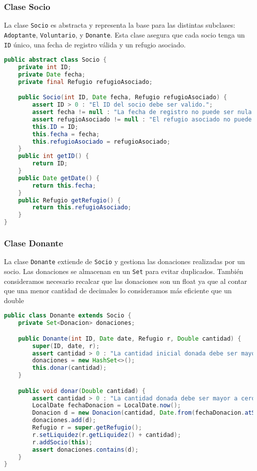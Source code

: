 \subsubsection{Clase Socio}
La clase \texttt{Socio} es abstracta y representa la base para las distintas subclases: 
\texttt{Adoptante}, \texttt{Voluntario}, y \texttt{Donante}. Esta clase asegura que 
cada socio tenga un \texttt{ID} único, una fecha de registro válida y un refugio asociado.
\label{codigo:socio}
\begin{lstlisting}[style = javaNormal, language=Java] 
public abstract class Socio {
    private int ID; 
    private Date fecha;
    private final Refugio refugioAsociado;

    public Socio(int ID, Date fecha, Refugio refugioAsociado) {
        assert ID > 0 : "El ID del socio debe ser valido.";
        assert fecha != null : "La fecha de registro no puede ser nula.";
        assert refugioAsociado != null : "El refugio asociado no puede ser nulo.";
        this.ID = ID;
        this.fecha = fecha;
        this.refugioAsociado = refugioAsociado;
    }
    public int getID() {
        return ID;
    }
    public Date getDate() {
        return this.fecha;
    }
    public Refugio getRefugio() {
        return this.refugioAsociado;
    }
}
\end{lstlisting}
\label{codigo:donante}
\subsubsection{Clase Donante}
La clase \texttt{Donante} extiende de \texttt{Socio} y gestiona las donaciones realizadas 
por un socio. Las donaciones se almacenan en un \texttt{Set} para evitar duplicados. También consideramos
necesario recalcar que las donaciones son un float ya que al contar que una menor cantidad de decimales
lo consideramos más eficiente que un double

\begin{lstlisting}[style = javaNormal, language=Java] 
public class Donante extends Socio {
    private Set<Donacion> donaciones;

    public Donante(int ID, Date date, Refugio r, Double cantidad) {
        super(ID, date, r);
        assert cantidad > 0 : "La cantidad inicial donada debe ser mayor a cero.";
        donaciones = new HashSet<>();
        this.donar(cantidad);
    }

    public void donar(Double cantidad) {
        assert cantidad > 0 : "La cantidad donada debe ser mayor a cero.";
        LocalDate fechaDonacion = LocalDate.now();
        Donacion d = new Donacion(cantidad, Date.from(fechaDonacion.atStartOfDay(ZoneId.systemDefault()).toInstant()), this);
        donaciones.add(d);
        Refugio r = super.getRefugio();
        r.setLiquidez(r.getLiquidez() + cantidad);
        r.addSocio(this);
        assert donaciones.contains(d);
    }
}
\end{lstlisting}


